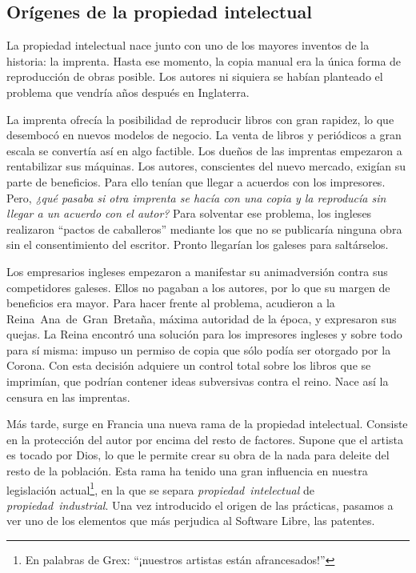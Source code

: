 \subsection{Orígenes de la propiedad intelectual}
La propiedad intelectual nace junto con uno de los mayores inventos de
la historia: la imprenta. Hasta ese momento, la copia manual era la
única forma de reproducción de obras posible. Los autores ni siquiera
se habían planteado el problema que vendría años después en
Inglaterra.

La imprenta ofrecía la posibilidad de reproducir libros con gran
rapidez, lo que desembocó en nuevos modelos de negocio. La venta de
libros y periódicos a gran escala se convertía así en algo
factible. Los dueños de las imprentas empezaron a rentabilizar sus
máquinas. Los autores, conscientes del nuevo mercado, exigían su parte
de beneficios. Para ello tenían que llegar a acuerdos con los
impresores. Pero, \emph{¿qué pasaba si otra imprenta se hacía con una
  copia y la reproducía sin llegar a un acuerdo con el autor?} Para
solventar ese problema, los ingleses realizaron ``pactos de
caballeros'' mediante los que no se publicaría ninguna obra sin el
consentimiento del escritor. Pronto llegarían los galeses para
saltárselos.

Los empresarios ingleses empezaron a manifestar su animadversión
contra sus competidores galeses. Ellos no pagaban a los autores, por
lo que su margen de beneficios era mayor. Para hacer frente al
problema, acudieron a la Reina~Ana~de~Gran~Bretaña, máxima autoridad
de la época, y expresaron sus quejas. La Reina encontró una solución
para los impresores ingleses y sobre todo para sí misma: impuso un
permiso de copia que sólo podía ser otorgado por la Corona. Con esta
decisión adquiere un control total sobre los libros que se imprimían,
que podrían contener ideas subversivas contra el reino. Nace así la
censura en las imprentas.

Más tarde, surge en Francia una nueva rama de la propiedad
intelectual. Consiste en la protección del autor por encima del resto
de factores. Supone que el artista es tocado por Dios, lo que le
permite crear su obra de la nada para deleite del resto de la población. Esta
rama ha tenido una gran influencia en nuestra legislación actual\footnote{En
palabras de Grex: ``¡nuestros artistas están afrancesados!''}, en la que se
separa \emph{propiedad~intelectual} de \emph{propiedad~industrial}. Una vez
introducido el origen de las prácticas, pasamos a ver uno de los
elementos que más perjudica al Software Libre, las patentes.

